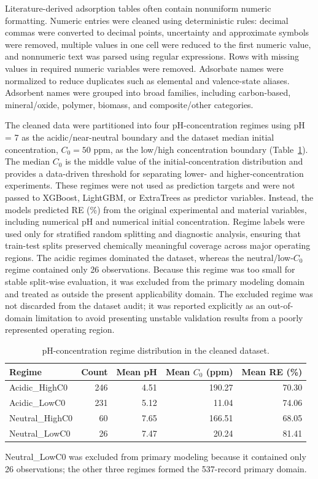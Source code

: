 \documentclass[review,12pt,number]{elsarticle}
\begin{document}
Literature-derived adsorption tables often contain nonuniform numeric formatting. Numeric entries were cleaned using deterministic rules: decimal commas were converted to decimal points, uncertainty and approximate symbols were removed, multiple values in one cell were reduced to the first numeric value, and nonnumeric text was parsed using regular expressions. Rows with missing values in required numeric variables were removed. Adsorbate names were normalized to reduce duplicates such as elemental and valence-state aliases. Adsorbent names were grouped into broad families, including carbon-based, mineral/oxide, polymer, biomass, and composite/other categories.

The cleaned data were partitioned into four pH-concentration regimes using pH = 7 as the acidic/near-neutral boundary and the dataset median initial concentration, $C_0 = 50$ ppm, as the low/high concentration boundary (Table~\ref{tab:regimes}). The median $C_0$ is the middle value of the initial-concentration distribution and provides a data-driven threshold for separating lower- and higher-concentration experiments. These regimes were not used as prediction targets and were not passed to XGBoost, LightGBM, or ExtraTrees as predictor variables. Instead, the models predicted RE (\%) from the original experimental and material variables, including numerical pH and numerical initial concentration. Regime labels were used only for stratified random splitting and diagnostic analysis, ensuring that train-test splits preserved chemically meaningful coverage across major operating regions. The acidic regimes dominated the dataset, whereas the neutral/low-$C_0$ regime contained only 26 observations. Because this regime was too small for stable split-wise evaluation, it was excluded from the primary modeling domain and treated as outside the present applicability domain. The excluded regime was not discarded from the dataset audit; it was reported explicitly as an out-of-domain limitation to avoid presenting unstable validation results from a poorly represented operating region.

\begin{table}[htbp]
\centering
\caption{pH-concentration regime distribution in the cleaned dataset.}
\label{tab:regimes}
\small
\begin{tabular}{lrrrr}
\toprule
Regime & Count & Mean pH & Mean $C_0$ (ppm) & Mean RE (\%) \\
\midrule
Acidic\_HighC0 & 246 & 4.51 & 190.27 & 70.30 \\
Acidic\_LowC0 & 231 & 5.12 & 11.04 & 74.06 \\
Neutral\_HighC0 & 60 & 7.65 & 166.51 & 68.05 \\
Neutral\_LowC0 & 26 & 7.47 & 20.24 & 81.41 \\
\bottomrule
\end{tabular}
\parbox{0.95\linewidth}{\footnotesize Neutral\_LowC0 was excluded from primary modeling because it contained only 26 observations; the other three regimes formed the 537-record primary domain.}
\end{table}
\end{document}
